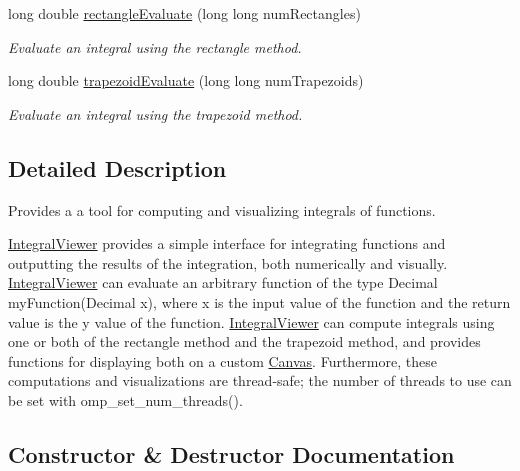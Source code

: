 \begin{DoxyCompactItemize}
long double \hyperlink{classtsgl_1_1_integral_viewer_a213d814ac293686ecd06c45344fa242f}{rectangle\+Evaluate} (long long num\+Rectangles)
\begin{DoxyCompactList}\small\item\em Evaluate an integral using the rectangle method. \end{DoxyCompactList}\item 
long double \hyperlink{classtsgl_1_1_integral_viewer_a485bd58c87267460baf013cdf786eae7}{trapezoid\+Evaluate} (long long num\+Trapezoids)
\begin{DoxyCompactList}\small\item\em Evaluate an integral using the trapezoid method. \end{DoxyCompactList}\end{DoxyCompactItemize}


\subsection{Detailed Description}
Provides a a tool for computing and visualizing integrals of functions. 

\hyperlink{classtsgl_1_1_integral_viewer}{Integral\+Viewer} provides a simple interface for integrating functions and outputting the results of the integration, both numerically and visually. \hyperlink{classtsgl_1_1_integral_viewer}{Integral\+Viewer} can evaluate an arbitrary function of the type {\ttfamily Decimal my\+Function(\+Decimal x)}, where x is the input value of the function and the return value is the y value of the function. \hyperlink{classtsgl_1_1_integral_viewer}{Integral\+Viewer} can compute integrals using one or both of the rectangle method and the trapezoid method, and provides functions for displaying both on a custom \hyperlink{classtsgl_1_1_canvas}{Canvas}. Furthermore, these computations and visualizations are thread-\/safe; the number of threads to use can be set with {\ttfamily omp\+\_\+set\+\_\+num\+\_\+threads()}. 

\subsection{Constructor \& Destructor Documentation}
\hypertarget{classtsgl_1_1_integral_viewer_a1fe15a118865fcaf3067dc73cf3f912c}{}
